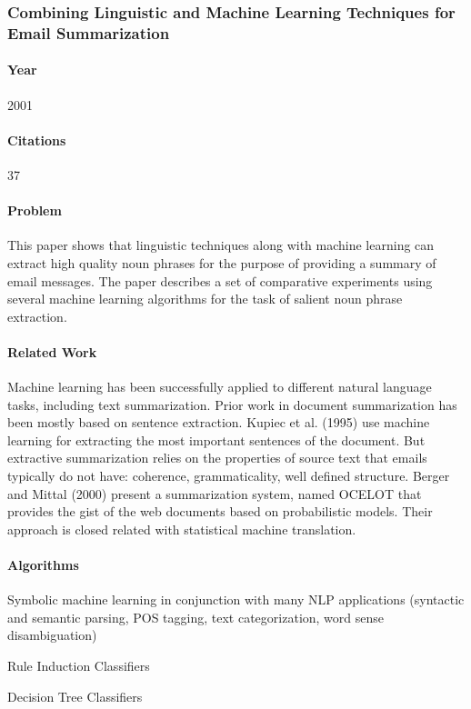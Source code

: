 
\subsubsection{Combining Linguistic and Machine Learning Techniques for Email
Summarization \cite{SMAR01}}

\paragraph{Year} 2001
\paragraph{Citations} 37

\paragraph{Problem} 
This paper shows that linguistic techniques along with machine learning can extract high quality noun phrases for the purpose of providing a summary of email messages. The paper describes a set of comparative experiments using several machine learning algorithms for the task of salient noun phrase extraction.

\paragraph{Related Work}
Machine learning has been successfully applied to different natural language tasks, including text summarization. Prior work in document summarization has been mostly based on sentence extraction. Kupiec et al. (1995) use machine learning for extracting the most important sentences of the document. But extractive summarization relies on the properties of source text that emails typically do not have: coherence, grammaticality, well defined structure. Berger and Mittal (2000) present a summarization system, named OCELOT that provides the gist of the web documents based on probabilistic models. Their approach is closed related with statistical machine translation.

\paragraph{Algorithms}
\begin{my_itemize}
  \item Symbolic machine learning in conjunction with many NLP applications (syntactic and semantic parsing, POS tagging, text categorization, word sense disambiguation)
  \item Rule Induction Classifiers
  \item Decision Tree Classifiers
\end{my_itemize}

